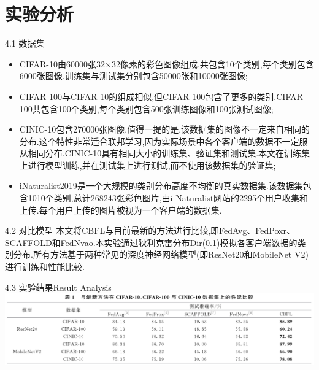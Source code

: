 \documentclass{sintefbeamer}
\theoremstyle{definition}
\begin{document}
%




\section{实验分析}

\begin{frame}{4.1 数据集}

	\begin{itemize}
\item[1)] CIFAR-10由60000张32×32像素的彩色图像组成,共包含10个类别,每个类别包含6000张图像.训练集与测试集分别包含50000张和10000张图像; 
\item[2)] CIFAR-100与CIFAR-10的组成相似,但CIFAR-100包含了更多的类别.CIFAR-100共包含100个类别,每个类别包含500张训练图像和100张测试图像; 
\item[3)] CINIC-10包含270000张图像.值得一提的是,该数据集的图像不一定来自相同的分布.这个特性非常适合联邦学习,因为实际场景中各个客户端的数据不一定服从相同分布.CINIC-10具有相同大小的训练集、验证集和测试集.本文在训练集上进行模型训练,并在测试集上进行测试,而不使用该数据集的验证集; 
\item[4)] iNaturalist2019是一个大规模的类别分布高度不均衡的真实数据集.该数据集包含1010个类别,总计268243张彩色图片,由i Naturalist网站的2295个用户收集和上传.每个用户上传的图片被视为一个客户端的数据集.
\end{itemize}
\end{frame}

\begin{frame}{4.2 对比模型}
	本文将CBFL与目前最新的方法进行比较,即FedAvg、FedPoxr、SCAFFOLD和FedNvao.本实验通过狄利克雷分布Dir(0.1)模拟各客户端数据的类别分布.所有方法基于两种常见的深度神经网络模型(即ResNet20和MobileNet V2)进行训练和性能比较.
\end{frame}


\begin{frame}{4.3 实验结果}{Result Analysis}
	\includegraphics[width=1.\textwidth]{images/img_expr2}
\end{frame}
\end{document}
